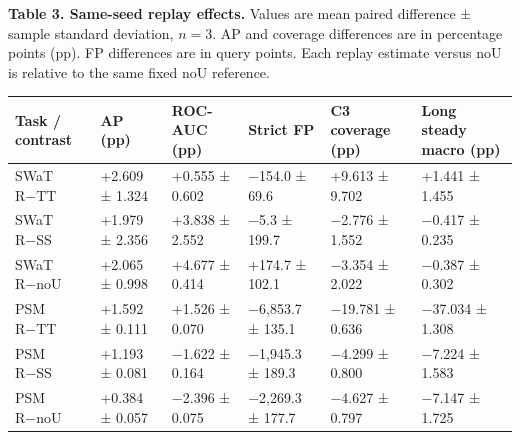 \documentclass[
  american,
]{article}
\begin{document}
\textbf{Table 3. Same-seed replay effects.} Values are mean paired
difference ± sample standard deviation, \(n=3\). AP and coverage
differences are in percentage points (pp). FP differences are in query
points. Each replay estimate versus noU is relative to the same fixed
noU reference.

\begin{longtable}[]{@{}
  >{\raggedright\arraybackslash}p{}
  >{\raggedleft\arraybackslash}p{}
  >{\raggedleft\arraybackslash}p{}
  >{\raggedleft\arraybackslash}p{}
  >{\raggedleft\arraybackslash}p{}
  >{\raggedleft\arraybackslash}p{}@{}}
\toprule\noalign{}
\begin{minipage}[b]{\linewidth}\raggedright
Task / contrast
\end{minipage} & \begin{minipage}[b]{\linewidth}\raggedleft
AP (pp)
\end{minipage} & \begin{minipage}[b]{\linewidth}\raggedleft
ROC-AUC (pp)
\end{minipage} & \begin{minipage}[b]{\linewidth}\raggedleft
Strict FP
\end{minipage} & \begin{minipage}[b]{\linewidth}\raggedleft
C3 coverage (pp)
\end{minipage} & \begin{minipage}[b]{\linewidth}\raggedleft
Long steady macro (pp)
\end{minipage} \\
\midrule\noalign{}
\endhead
\bottomrule\noalign{}
\endlastfoot
SWaT R−TT & +2.609 ± 1.324 & +0.555 ± 0.602 & −154.0 ± 69.6 & +9.613 ±
9.702 & +1.441 ± 1.455 \\
SWaT R−SS & +1.979 ± 2.356 & +3.838 ± 2.552 & −5.3 ± 199.7 & −2.776 ±
1.552 & −0.417 ± 0.235 \\
SWaT R−noU & +2.065 ± 0.998 & +4.677 ± 0.414 & +174.7 ± 102.1 & −3.354 ±
2.022 & −0.387 ± 0.302 \\
PSM R−TT & +1.592 ± 0.111 & +1.526 ± 0.070 & −6,853.7 ± 135.1 & −19.781
± 0.636 & −37.034 ± 1.308 \\
PSM R−SS & +1.193 ± 0.081 & −1.622 ± 0.164 & −1,945.3 ± 189.3 & −4.299 ±
0.800 & −7.224 ± 1.583 \\
PSM R−noU & +0.384 ± 0.057 & −2.396 ± 0.075 & −2,269.3 ± 177.7 & −4.627
± 0.797 & −7.147 ± 1.725 \\
\end{longtable}
\end{document}
